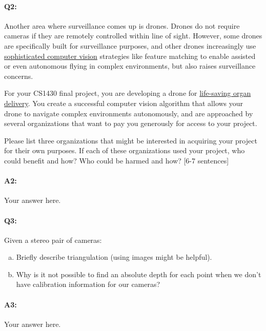 \paragraph{Q2:} Another area where surveillance comes up is drones. Drones do not require cameras if they are remotely controlled within line of sight. However, some drones are specifically built for surveillance purposes, and other drones increasingly use \href{https://link.springer.com/article/10.1007/s10846-017-0483-z}{sophisticated computer vision} strategies like feature matching to enable assisted or even autonomous flying in complex environments, but also raises surveillance concerns. 

For your CS1430 final project, you are developing a drone for \href{https://www.cnn.com/2019/05/01/health/drone-organ-transplant-bn-trnd/index.html}{life-saving organ delivery}. You create a successful computer vision algorithm that allows your drone to navigate complex environments autonomously, and are approached by several organizations that want to pay you generously for access to your project.

Please list three organizations that might be interested in acquiring your project for their own purposes. If each of these organizations used your project, who could benefit and how? Who could be harmed and how? [6-7 sentences]


\paragraph{A2:} Your answer here.
\pagebreak
\paragraph{Q3:} Given a stereo pair of cameras:
\begin{enumerate} [(a)]
\item Briefly describe triangulation (using images might be helpful).
\item Why is it not possible to find an absolute depth for each point when we don't have calibration information for our cameras?
\end{enumerate}

\paragraph{A3:} Your answer here.


